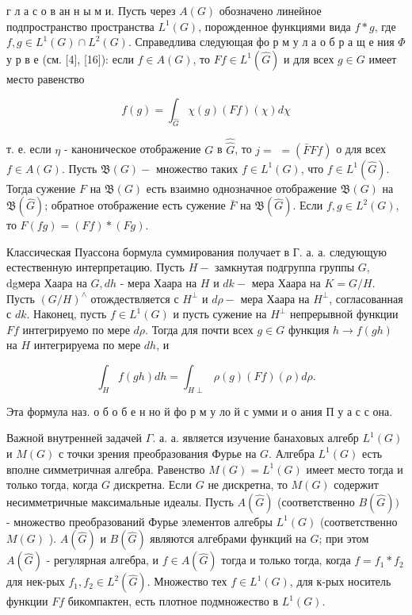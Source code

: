 \documentclass[10pt]{article}
\begin{document}
г л а с о в ан н ы м и. Пусть через $A(G)$ обозначено линейное подпространство пространства $L^{1}(G)$, порожденное функциями вида $f * g$, где $f, g \in L^{1}(G) \cap L^{2}(G)$. Справедлива следующая фо р м у л а о б р а щ е ния $\Phi$ у р в е (см. [4], [16]): если $f \in A(G)$, то $F f \in L^{1}(\widehat{G})$ и для всех $g \in G$ имеет место равенство



\[

f(g)=\int_{\widehat{G}} \chi(g)(F f)(\chi) d \chi

\]



т. е. если $\eta$ - каноническое отображение $G$ в $\hat{\hat{G}}$, то $j=$ $=(\bar{F} F f)$ о для всех $f \in A(G)$. Пусть $\mathfrak{B}(G)-$ множество таких $f \in L^{1}(G)$, что $f \in L^{1}(\widehat{G})$. Тогда сужение $F$ на $\mathfrak{B}(G)$ есть взаимно однозначное отображение $\mathfrak{B}(G)$ на $\mathfrak{B}(\widehat{G})$; обратное отображение есть сужение $\bar{F}$ на $\mathfrak{B}(\widehat{G})$. Если $f, g \in L^{2}(G)$, то $F(f g)=(F f) *(F g)$.



Классическая Пуассона бормула суммирования получает в Г. а. а. следующую естественную интерпретацию. Пусть $H-$ замкнутая подгруппа группы $G$, dgмера Хаара на $G, d h$ - мера Хаара на $H$ и $d k-$ мера Хаара на $K=G / H$. Пусть $(G / H)^{\wedge}$ отождествляется с $H^{\perp}$ и $d \rho-$ мера Хаара на $H^{\perp}$, согласованная с $d k$. Наконец, пусть $f \in L^{1}(G)$ и пусть сужение на $H^{\perp}$ непрерывной функции $F f$ интегрируемо по мере $d \rho$. Тогда для почти всех $g \in G$ функция $h \rightarrow f(g h)$ на $H$ интегрируема по мере $d h$, и



\[

\int_{H} f(g h) d h=\int_{H \perp} \rho(g)(F f)(\rho) d \rho .

\]



Эта формула наз. о б о б е н но й фо р м у ло й с умми и о ания П у а с с она.



Важной внутренней задачей $\Gamma$. а. а. является изучение банаховых алгебр $L^{1}(G)$ и $M(G)$ с точки зрения преобразования Фурье на $G$. Алгебра $L^{1}(G)$ есть вполне симметричная алгебра. Равенство $M(G)=L^{1}(G)$ имеет место тогда и только тогда, когда $G$ дискретна. Если $G$ не дискретна, то $M(G)$ содержит несимметричные максимальные идеалы. Пусть $A(\hat{G})$ (соответственно $B(\widehat{G}))$ - множество преобразований Фурье элементов алгебры $L^{1}(G)$ (соответственно $M(G)$ ). $A(\widehat{G})$ и $B(\widehat{G})$ являются алгебрами функций на $\widehat{G}$; при этом $A(\widehat{G})$ - регулярная алгебра, и $f \in A(\widehat{G})$ тогда и только тогда, когда $f=f_{1} * f_{2}$ для нек-рых $f_{1}, f_{2} \in L^{2}(\widehat{G})$. Множество тех $f \in L^{1}(G)$, для к-рых носитель функции $F f$ бикомпактен, есть плотное подмножество в $L^{1}(G)$.
\end{document}
